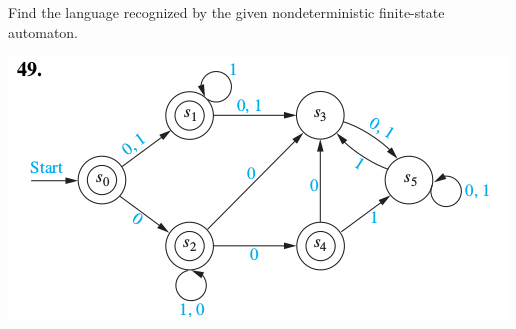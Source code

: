 \documentclass[../main.tex]{subfiles}
\begin{document}
Find the language recognized by the given nondeterministic finite-state automaton.

\includegraphics[width=\textwidth]{img/Q13_3_49}
\solution
\end{document}

